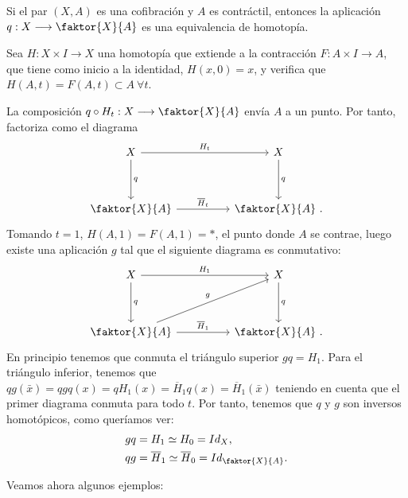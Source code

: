 \begin{teor}
Si el par $(X, A)$ es una cofibración y $A$ es contráctil, entonces la aplicación $q : X \longrightarrow \faktor{X}{A}$ es una equivalencia de homotopía.
\end{teor}
\begin{demo}
Sea $H : X \times I \longrightarrow X$ una homotopía que extiende a la contracción $F : A \times I \longrightarrow A$, que tiene como inicio a la identidad, $H(x,0) = x$, y verifica que $H(A,t) = F(A,t) \subset A \ \forall t$. \par
La composición $ q \circ H_t : X \longrightarrow \faktor{X}{A}$ envía $A$ a un punto. Por tanto, factoriza como el diagrama
\[ \begin{tikzcd}
	X \arrow{rr}{H_t} \arrow{dd}{q}  & & X \arrow{dd}{q} \\
	\\
	\faktor{X}{A} \arrow{rr}{\overline{H}_t} & & \faktor{X}{A} \ .
\end{tikzcd} \]
Tomando $t = 1$,  $H(A, 1) = F(A, 1) = \ast$, el punto donde $A$ se contrae, luego existe una aplicación $g$ tal que el siguiente diagrama es conmutativo:
\[ \begin{tikzcd}
	X \arrow{rr}{H_1} \arrow{dd}{q} & & X \arrow{dd}{q} \\
	\\
	\faktor{X}{A} \arrow{rr}{\overline{H}_1} \arrow{uurr}{g} & & \faktor{X}{A} \ .
\end{tikzcd} \]
En principio tenemos que conmuta el triángulo superior $gq = H_1$. Para el triángulo inferior, tenemos que $qg(\bar{x}) = qgq(x) = qH_1(x) =\overline{H}_1 q(x) = \overline{H}_1(\bar{x})  $ teniendo en cuenta que el primer diagrama conmuta para todo $t$. Por tanto, tenemos que $q$ y $g$ son inversos homotópicos, como queríamos ver:
\begin{align*}
gq &= H_1 \simeq H_0 = Id_X, \\
qg &= \overline{H}_1 \simeq \overline{H}_0 = Id_{\faktor{X}{A}}.
\end{align*}
\end{demo}
Veamos ahora algunos ejemplos:
